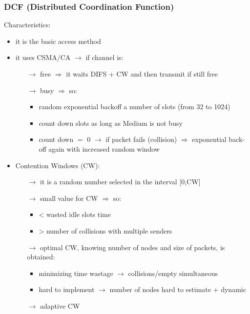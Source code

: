 \subsubsection{DCF (Distributed Coordination Function)}
Characteristics:
\begin{itemize}
    \item it is the basic access method
    \item it uses CSMA/CA $\rightarrow$ if channel is:
    \begin{itemize}
        \item[$\rightarrow$] free $\Rightarrow$ it waits DIFS + CW and then transmit if still free
        \item[$\rightarrow$] busy $\Rightarrow$ so:
        \begin{itemize}
            \item random exponential backoff a number of slots (from 32 to 1024)
            \item count down slots as long as Medium is not busy
            \item count down $=$ 0 $\rightarrow$ if packet fails (collision)
            $\Rightarrow$ exponential back-off again with increased random window
        \end{itemize}
    \end{itemize}
    \item Contention Windows (CW):
    \begin{itemize}
        \item[$\rightarrow$] it is a random number selected in the interval [0,CW]
        \item[$\rightarrow$] small value for CW $\Rightarrow$ so:
        \begin{itemize}
            \item < wasted idle slots time
            \item > number of collisions with multiple senders 
        \end{itemize}
        \item[$\rightarrow$] optimal CW, knowing number of nodes and size of packets, is obtained:
        \begin{itemize}
            \item minimizing time wastage $\rightarrow$ collisions/empty simultaneous
            \item hard to implement $\rightarrow$ number of nodes hard to estimate + dynamic
        \end{itemize}
        \item[$\rightarrow$] adaptive CW

\end{itemize}
\end{itemize}
